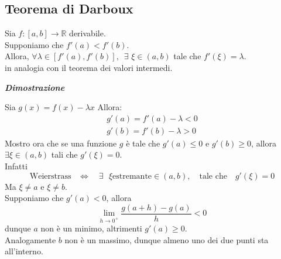 \documentclass{article}
\theoremstyle{definition}
\newcommand{\R}{\mathbb{R}}
\begin{document}
\subsection{Teorema di Darboux}
Sia $f:[a,b] \to \R$ derivabile.
\\
Supponiamo che $f'(a) < f'(b)$.
\\
Allora, $\forall \lambda \in [f'(a),f'(b)], \,\,\, \exists \,\, \xi \in (a,b)$ tale che $f'(\xi)=\lambda$.
\\
in analogia con il teorema dei valori intermedi.
\\
\begin{center}
    \textbf{\textit{Dimostrazione}}
\end{center}
Sia $g(x)=f(x)-\lambda x$
Allora:
\begin{align}
    g'(a)=f'(a)-\lambda < 0 \\
    g'(b)=f'(b)-\lambda > 0
\end{align}
Mostro ora che se una funzione $g$ è tale che $g'(a) \leqslant 0$ e $g'(b) \geqslant 0$, allora $\exists \xi \in (a,b)$ tali che $g'(\xi)=0$.
\\
Infatti 
\begin{equation}
    \mbox{Weierstrass} \,\,\,\,\,\Longleftrightarrow \,\,\,\,\,\, \exists \,\,\,\, \xi \mbox{estremante} \in (a,b), \,\,\,\,\,\, \mbox{tale che}\,\,\,\,\,\, g'(\xi)=0
\end{equation}
Ma $\xi \neq a$ e $\xi \neq b$.\\
Supponiamo che $g'(a) < 0$, allora
\begin{equation}
    \lim_{h \to 0^+}\frac{g(a+h)-g(a)}{h}<0
\end{equation}
dunque $a$ non è un minimo, altrimenti $g'(a) \geqslant 0$.
\\
Analogamente $b$ non è un massimo, dunque almeno uno dei due punti sta all'interno.
\end{document}
